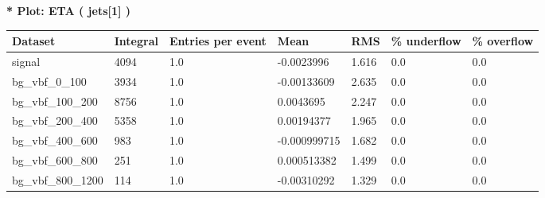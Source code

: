 \documentclass[a4paper, 10pt]{article}
\begin{document}
\textbf{* Plot: ETA ( jets[1] ) }\\
   \begin{table}[H]
  \begin{center}
    \begin{tabular}{|m{23.0mm}|m{23.0mm}|m{18.0mm}|m{19.0mm}|m{19.0mm}|m{19.0mm}|m{19.0mm}|}
      \hline
      {\cellcolor{yellow}         Dataset}& {\cellcolor{yellow}         Integral}& {\cellcolor{yellow}         Entries per event}& {\cellcolor{yellow}         Mean}& {\cellcolor{yellow}         RMS}& {\cellcolor{yellow}         \% underflow}& {\cellcolor{yellow}         \% overflow}\\
      \hline
      {\cellcolor{white}         signal}& {\cellcolor{white}         4094}& {\cellcolor{white}         1.0}& {\cellcolor{white}         -0.0023996}& {\cellcolor{white}         1.616}& {\cellcolor{green}         0.0}& {\cellcolor{green}         0.0}\\
      \hline
      {\cellcolor{white}         bg\_vbf\_0\_100}& {\cellcolor{white}         3934}& {\cellcolor{white}         1.0}& {\cellcolor{white}         -0.00133609}& {\cellcolor{white}         2.635}& {\cellcolor{green}         0.0}& {\cellcolor{green}         0.0}\\
      \hline
      {\cellcolor{white}         bg\_vbf\_100\_200}& {\cellcolor{white}         8756}& {\cellcolor{white}         1.0}& {\cellcolor{white}         0.0043695}& {\cellcolor{white}         2.247}& {\cellcolor{green}         0.0}& {\cellcolor{green}         0.0}\\
      \hline
      {\cellcolor{white}         bg\_vbf\_200\_400}& {\cellcolor{white}         5358}& {\cellcolor{white}         1.0}& {\cellcolor{white}         0.00194377}& {\cellcolor{white}         1.965}& {\cellcolor{green}         0.0}& {\cellcolor{green}         0.0}\\
      \hline
      {\cellcolor{white}         bg\_vbf\_400\_600}& {\cellcolor{white}         983}& {\cellcolor{white}         1.0}& {\cellcolor{white}         -0.000999715}& {\cellcolor{white}         1.682}& {\cellcolor{green}         0.0}& {\cellcolor{green}         0.0}\\
      \hline
      {\cellcolor{white}         bg\_vbf\_600\_800}& {\cellcolor{white}         251}& {\cellcolor{white}         1.0}& {\cellcolor{white}         0.000513382}& {\cellcolor{white}         1.499}& {\cellcolor{green}         0.0}& {\cellcolor{green}         0.0}\\
      \hline
      {\cellcolor{white}         bg\_vbf\_800\_1200}& {\cellcolor{white}         114}& {\cellcolor{white}         1.0}& {\cellcolor{white}         -0.00310292}& {\cellcolor{white}         1.329}& {\cellcolor{green}         0.0}& {\cellcolor{green}         0.0}\\

\end{tabular}
\end{center}
\end{table}
\end{document}
